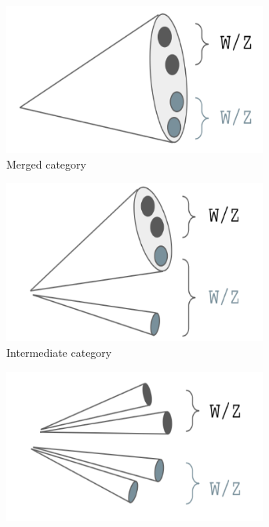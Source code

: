 \documentclass[12pt]{article}
\begin{document}
\begin{figure}[H]
     \centering
     \begin{subfigure}[b]{0.29\textwidth}
         \centering
         \includegraphics[width=0.95\textwidth]{figures/had_merged.png}
         \caption[]{Merged category}
         \label{fig:had_merged}
     \end{subfigure}
     \hfill
     \begin{subfigure}[b]{0.29\textwidth}
         \centering
         \includegraphics[width=0.95\textwidth]{figures/had_int.png}
         \caption[]{Intermediate category}
         \label{fig:had_int}
     \end{subfigure}
     \hfill
     \begin{subfigure}[b]{0.29\textwidth}
         \centering
         \includegraphics[width=0.95\textwidth]{figures/had_resolved.png}

\end{subfigure}
\end{figure}
\end{document}
